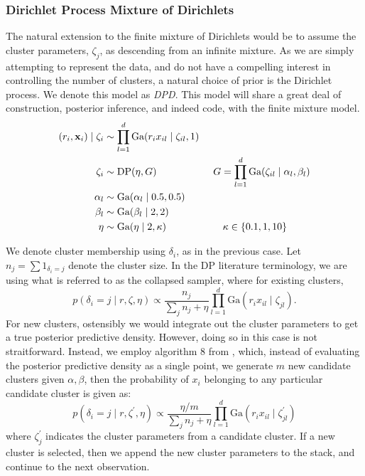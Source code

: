 \subsubsection{Dirichlet Process Mixture of Dirichlets}
\label{model:dpd}
The natural extension to the finite mixture of Dirichlets would be to assume the cluster parameters,
  $\zeta_j$, as descending from an infinite mixture.  As we are simply attempting to represent the
  data, and do not have a compelling interest in controlling the number of clusters, a natural
  choice of prior is the Dirichlet process.  We denote this model as \emph{DPD}.  This model will
  share a great deal of construction, posterior inference, and indeed code, with the finite
  mixture model.
  \begin{equation}
    \label{eq:dpsimplex}
    \begin{aligned}
      (r_i, {\bf x}_i) \mid \zeta_i &\sim \prod_{l = 1}^d\text{Ga}(r_ix_{il}\mid \zeta_{il}, 1)\\
      \zeta_i &\sim \text{DP}(\eta, G)\hspace{2cm}G = \prod_{l = 1}^d \text{Ga}(\zeta_{il}\mid \alpha_l,\beta_l)\\
      \alpha_l &\sim \text{Ga}(\alpha_l \mid 0.5, 0.5)\\
      \beta_l &\sim \text{Ga}(\beta_l \mid 2, 2)\\
      \eta &\sim \text{Ga}(\eta \mid 2, \kappa) \hspace{2cm}\kappa \in \lbrace 0.1, 1, 10\rbrace
    \end{aligned}
  \end{equation}

We denote cluster membership using $\delta_i$, as in the previous case.  Let
  $n_j = \sum 1_{\delta_i = j}$ denote the cluster size.  In the DP literature terminology, we
  are using what is referred to as the collapsed sampler, where for existing clusters,
  \begin{equation}
    p(\delta_i = j \mid r, \zeta, \eta) \propto \frac{n_j}{\sum_j n_j + \eta}
                \prod_{l = 1}^d\text{Ga}(r_ix_{il}\mid\zeta_{jl}).
  \end{equation}
For new clusters, ostensibly we would integrate out the cluster parameters to get a true
  posterior predictive density.  However, doing so in this case is not straitforward.  Instead,
  we employ algorithm 8 from \cite{neal2000}, which, instead of evaluating the posterior predictive
  density as a single point, we generate $m$ new candidate clusters given $\alpha,\beta$, then the
  probability of $x_i$ belonging to any particular candidate cluster is given as:
  \begin{equation}
    p(\delta_i = j \mid r, \zeta^{\prime}, \eta) \propto \frac{\eta / m}{\sum_j n_j + \eta}
                \prod_{l = 1}^d\text{Ga}(r_ix_{il}\mid\zeta_{jl}^{\prime})
  \end{equation}
  where $\zeta_j^{\prime}$ indicates the cluster parameters from a candidate cluster.  If a new
  cluster is selected, then we append the new cluster parameters to the stack, and continue to the
  next observation.

